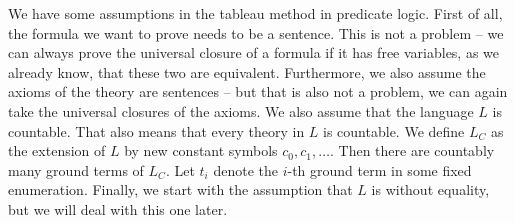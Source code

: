 We have some assumptions in the tableau method in predicate logic. First of all, the formula we want to prove needs to be a sentence. This is not a problem -- we can always prove the universal closure of a formula if it has free variables, as we already know, that these two are equivalent. Furthermore, we also assume the axioms of the theory are sentences -- but that is also not a problem, we can again take the universal closures of the axioms. We also assume that the language $L$ is countable. That also means that every theory in $L$ is countable. We define $L_C$ as the extension of $L$ by new constant symbols $c_0, c_1, \dots$. Then there are countably many ground terms of $L_C$. Let $t_i$ denote the $i$-th ground term in some fixed enumeration. Finally, we start with the assumption that $L$ is without equality, but we will deal with this one later.

